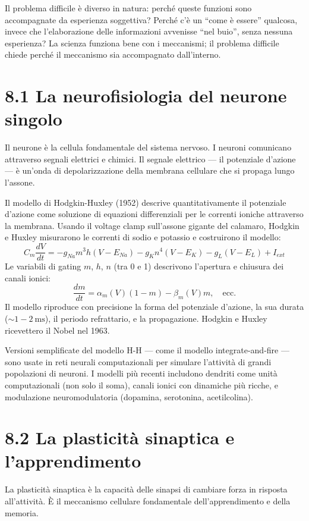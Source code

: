 \documentclass[11.5pt,a4paper,openany]{book}
\theoremstyle{remark}
\begin{document}
Il problema difficile è diverso in natura: perché queste funzioni sono accompagnate da esperienza soggettiva? Perché c'è un ``come è essere'' qualcosa, invece che l'elaborazione delle informazioni avvenisse ``nel buio'', senza nessuna esperienza? La scienza funziona bene con i meccanismi; il problema difficile chiede perché il meccanismo sia accompagnato dall'interno.

\section{8.1 La neurofisiologia del neurone singolo}

Il neurone è la cellula fondamentale del sistema nervoso. I neuroni comunicano attraverso segnali elettrici e chimici. Il segnale elettrico --- il potenziale d'azione --- è un'onda di depolarizzazione della membrana cellulare che si propaga lungo l'assone.

Il modello di Hodgkin-Huxley (1952) descrive quantitativamente il potenziale d'azione come soluzione di equazioni differenziali per le correnti ioniche attraverso la membrana. Usando il voltage clamp sull'assone gigante del calamaro, Hodgkin e Huxley misurarono le correnti di sodio e potassio e costruirono il modello:
\[
C_m \frac{dV}{dt} = -g_{Na} m^3 h (V - E_{Na}) - g_K n^4 (V - E_K) - g_L (V - E_L) + I_{ext}
\]
Le variabili di gating $m$, $h$, $n$ (tra 0 e 1) descrivono l'apertura e chiusura dei canali ionici:
\[
\frac{dm}{dt} = \alpha_m(V)(1-m) - \beta_m(V)m, \quad \text{ecc.}
\]
Il modello riproduce con precisione la forma del potenziale d'azione, la sua durata ($\sim 1-2\ \text{ms}$), il periodo refrattario, e la propagazione. Hodgkin e Huxley ricevettero il Nobel nel 1963.

Versioni semplificate del modello H-H --- come il modello integrate-and-fire --- sono usate in reti neurali computazionali per simulare l'attività di grandi popolazioni di neuroni. I modelli più recenti includono dendriti come unità computazionali (non solo il soma), canali ionici con dinamiche più ricche, e modulazione neuromodulatoria (dopamina, serotonina, acetilcolina).

\section{8.2 La plasticità sinaptica e l'apprendimento}

La plasticità sinaptica è la capacità delle sinapsi di cambiare forza in risposta all'attività. È il meccanismo cellulare fondamentale dell'apprendimento e della memoria.
\end{document}
